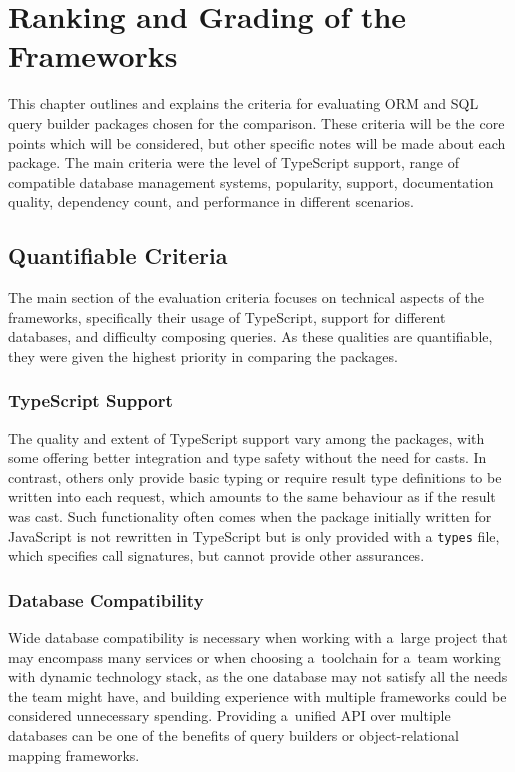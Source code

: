 \chapter{Ranking and Grading of the Frameworks}\label{ch:RankingCriteria}

This chapter outlines and explains the criteria for evaluating ORM and SQL query
builder packages chosen for the comparison. These criteria will be the core
points which will be considered, but other specific notes will be made about
each package. The main criteria were the level of TypeScript support, range of
compatible database management systems, popularity, support, documentation
quality, dependency count, and performance in different scenarios.

\section{Quantifiable Criteria}

The main section of the evaluation criteria focuses on technical aspects of the
frameworks, specifically their usage of TypeScript, support for different
databases, and difficulty composing queries. As these qualities are
quantifiable, they were given the highest priority in comparing the packages.

\subsection{TypeScript Support}

The quality and extent of TypeScript support vary among the packages, with some
offering better integration and type safety without the need for casts. In
contrast, others only provide basic typing or require result type definitions to
be written into each request, which amounts to the same behaviour as if the
result was cast. Such functionality often comes when the package initially
written for JavaScript is not rewritten in TypeScript but is only provided with
a \texttt{types} file, which specifies call signatures, but cannot provide other
assurances.

\subsection{Database Compatibility}

Wide database compatibility is necessary when working with a~large project that
may encompass many services or when choosing a~toolchain for a~team working with
dynamic technology stack, as the one database may not satisfy all the needs the
team might have, and building experience with multiple frameworks could be
considered unnecessary spending. Providing a~unified API over multiple databases
can be one of the benefits of query builders or object-relational mapping
frameworks.

